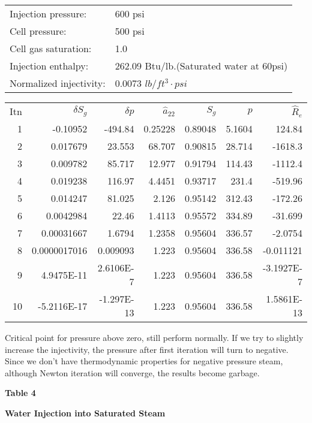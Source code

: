\documentclass[11pt]{article}
\begin{document}
\begin{tabular}{ l l }
    Injection pressure: & 600 psi \\
    Cell pressure: & 500 psi \\
    Cell gas saturation: & 1.0 \\
    Injection enthalpy: & 262.09 Btu/lb.(Saturated water at 60psi) \\
    Normalized injectivity: & 0.0073 $lb/ft^3\cdot psi$\\
\end{tabular}
\vspace{20pt}

\begin{table}[H]
\centering
\begin{tabular}{ r r r r r r r }
    Itn & $\delta S_g$ & $\delta p$ & $\hat{a}_{22}$ &
    $S_g$ & $p$ & $\hat{R}_e$ \\
    1 & -0.10952 & -494.84 & 0.25228 & 0.89048 & 5.1604 & 124.84 \\
    2 & 0.017679 & 23.553 & 68.707 & 0.90815 & 28.714 & -1618.3 \\
    3 & 0.009782 & 85.717 & 12.977 & 0.91794 & 114.43 & -1112.4 \\
    4 & 0.019238 & 116.97 & 4.4451 & 0.93717 & 231.4 & -519.96 \\
    5 & 0.014247 & 81.025 & 2.126 & 0.95142 & 312.43 & -172.26 \\
    6 & 0.0042984 & 22.46 & 1.4113 & 0.95572 & 334.89 & -31.699 \\
    7 & 0.00031667 & 1.6794 & 1.2358 & 0.95604 & 336.57 & -2.0754 \\
    8 & 0.0000017016 & 0.009093 & 1.223 & 0.95604 & 336.58 & -0.011121 \\
    9 & 4.9475E-11 & 2.6106E-7 & 1.223 & 0.95604 & 336.58 & -3.1927E-7 \\
    10 & -5.2116E-17 & -1.297E-13 & 1.223 & 0.95604 & 336.58 & 1.5861E-13 \\
\end{tabular}
\end{table}

    Critical point for pressure above zero, still perform normally. If we try to slightly
    increase the injectivity, the pressure after first iteration will turn to negative.
    Since we don't have thermodynamic properties for negative pressure steam,
    although Newton iteration will converge, the results become garbage.

\newpage
\centerline{\textbf{Table 4 }}
\centerline{\textbf{Water Injection into Saturated Steam}}
\vspace{20pt}
\end{document}
